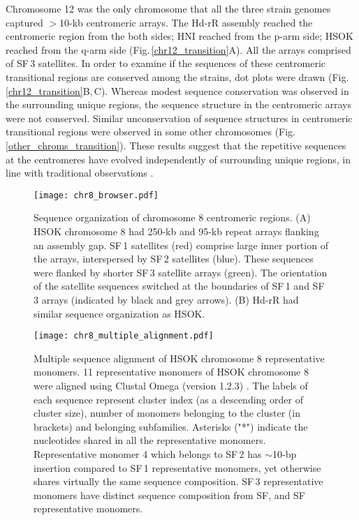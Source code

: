   Chromosome 12 was the only chromosome that all the three strain genomes captured $>$10-kb centromeric arrays. The Hd-rR assembly reached the centromeric region from the both sides; HNI reached from the p-arm side; HSOK reached from the q-arm side (Fig.\,\ref{chr12_transition}A). All the arrays comprised of SF\,3 satellites. In order to examine if the sequences of these centromeric transitional regions are conserved among the strains, dot plots were drawn (Fig.\,\ref{chr12_transition}B,\,C). Whereas modest sequence conservation was observed in the surrounding unique regions, the sequence structure in the centromeric arrays were not conserved. Similar unconservation of sequence structures in centromeric transitional regions were observed in some other chromosomes (Fig.\,\ref{other_chroms_transition}). These results suggest that the repetitive sequences at the centromeres have evolved independently of surrounding unique regions, in line with traditional observations \cite{Willard1991}.



  \begin{figure*}
    \centering
    \texttt{[image: chr8\_browser.pdf]}
    \caption{
      Sequence organization of chromosome 8 centromeric regions. (A) HSOK chromosome 8 had 250-kb and 95-kb repeat arrays flanking an assembly gap. SF\,1 satellites (red) comprise large inner portion of the arrays, interspersed by SF\,2 satellites (blue). These sequences were flanked by shorter SF\,3 satellite arrays (green). The orientation of the satellite sequences switched at the boundaries of SF\,1 and SF\,3 arrays (indicated by black and grey arrows). (B) Hd-rR had similar sequence organization as HSOK.
    }
    \label{chr8_browser}
  \end{figure*}

  \begin{figure*}
    \centering
    \texttt{[image: chr8\_multiple\_alignment.pdf]}
    \caption{
      Multiple sequence alignment of HSOK chromosome 8 representative monomers. 11 representative monomers of HSOK chromosome 8 were aligned using Clustal Omega (version 1.2.3) \cite{Sievers2011}. The labels of each sequence represent cluster index (as a descending order of cluster size), number of monomers belonging to the cluster (in brackets) and belonging subfamilies. Asterisks ("*") indicate the nucleotides shared in all the representative monomers. Representative monomer 4 which belongs to SF\,2 has $\sim$10-bp insertion compared to SF\,1 representative monomers, yet otherwise shares virtually the same sequence composition. SF\,3 representative monomers have distinct sequence composition from SF\1, and SF\2 representative monomers.
    }
    \label{chr8_multiple_alignment}
  \end{figure*}

